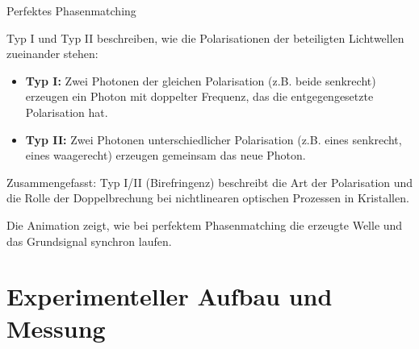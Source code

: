 \documentclass[notes=only]{beamer}
\begin{document}
\begin{frame}{Perfektes Phasenmatching}
{Typ I und Typ II beschreiben, wie die Polarisationen der beteiligten Lichtwellen zueinander stehen:
\begin{itemize}
  \item \textbf{Typ I:} Zwei Photonen der gleichen Polarisation (z.B. beide senkrecht) erzeugen ein Photon mit doppelter Frequenz, das die entgegengesetzte Polarisation hat.
  \item \textbf{Typ II:} Zwei Photonen unterschiedlicher Polarisation (z.B. eines senkrecht, eines waagerecht) erzeugen gemeinsam das neue Photon.
\end{itemize}
Zusammengefasst:
Typ I/II (Birefringenz) beschreibt die Art der Polarisation und die Rolle der Doppelbrechung bei nichtlinearen optischen Prozessen in Kristallen.

    Die Animation zeigt, wie bei perfektem Phasenmatching die erzeugte Welle und das Grundsignal synchron laufen.
  }
\end{frame}


\section{Experimenteller Aufbau und Messung}
\end{document}
